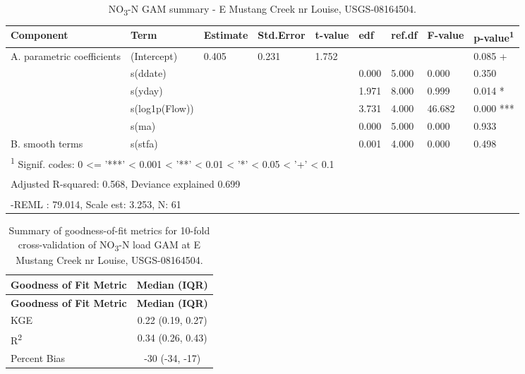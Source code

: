 \documentclass[
]{article}
\newenvironment{widestuff}{\begin{table}[h]\begin{adjustwidth}{-4.5cm}{-4.5cm}\centering}{\end{adjustwidth}\end{table}}
\begin{document}
\begin{widestuff}

\caption{NO\textsubscript{3}-N GAM summary - E Mustang Creek nr Louise, USGS-08164504.}
\centering
\begin{tabular}[t]{lllllllll}
\toprule
Component & Term & Estimate & Std.Error & t-value & edf & ref.df & F-value & p-value\textsuperscript{1}\\
\midrule
A. parametric coefficients & (Intercept) & 0.405 & 0.231 & 1.752 &  &  &  & 0.085 +\\
\cmidrule{1-9}
 & s(ddate) &  &  &  & 0.000 & 5.000 & 0.000 & 0.350\\

 & s(yday) &  &  &  & 1.971 & 8.000 & 0.999 & 0.014 *\\

 & s(log1p(Flow)) &  &  &  & 3.731 & 4.000 & 46.682 & 0.000 ***\\

 & s(ma) &  &  &  & 0.000 & 5.000 & 0.000 & 0.933\\

\multirow[t]{-5}{*}{\raggedright\arraybackslash B. smooth terms} & s(stfa) &  &  &  & 0.001 & 4.000 & 0.000 & 0.498\\
\bottomrule
\multicolumn{9}{l}{\textsuperscript{1} Signif. codes: 0 <= '***' < 0.001 < '**' < 0.01 < '*' < 0.05 < '+' < 0.1}\\
\multicolumn{9}{l}{\textsuperscript{} Adjusted R-squared: 0.568, Deviance explained 0.699}\\
\multicolumn{9}{l}{\textsuperscript{} -REML : 79.014, Scale est: 3.253, N: 61}\\
\end{tabular}
\end{widestuff}

\hypertarget{tbl-NO308164504-CV}{}
\begin{longtable}[]{@{}lc@{}}
\caption{\label{tbl-NO308164504-CV}Summary of goodness-of-fit metrics
for 10-fold cross-validation of NO\textsubscript{3}-N load GAM at E
Mustang Creek nr Louise, USGS-08164504.}\tabularnewline
\toprule()
\textbf{Goodness of Fit Metric} & \textbf{Median (IQR)} \\
\midrule()
\endfirsthead
\toprule()
\textbf{Goodness of Fit Metric} & \textbf{Median (IQR)} \\
\midrule()
\endhead
KGE & 0.22 (0.19, 0.27) \\
R\textsuperscript{2} & 0.34 (0.26, 0.43) \\
Percent Bias & -30 (-34, -17) \\
\bottomrule()
\end{longtable}
\end{document}
